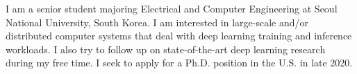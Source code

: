 

\begin{cvparagraph}

I am a senior student majoring Electrical and Computer Engineering at Seoul National University, South Korea. 
I am interested in large-scale and/or distributed computer systems that deal with deep learning training and inference workloads. 
I also try to follow up on state-of-the-art deep learning research during my free time. 
I seek to apply for a Ph.D. position in the U.S. in late 2020.
\end{cvparagraph}
